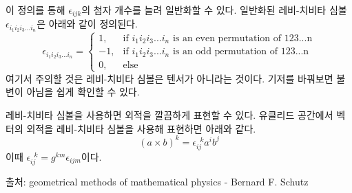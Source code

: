이 정의를 통해 $\epsilon_{ijk}$의 첨자 개수를 늘려 일반화할 수 있다. 일반화된 레비-치비타 심볼 $\epsilon_{i_1 i_2 i_3 ... i_n}$은 아래와 같이 정의된다.
\begin{equation}
    \epsilon_{i_1 i_2 i_3 ... i_n}=
    \begin{cases}
    1, & \mbox{if }i_1 i_2 i_3 ... i_n\mbox{ is an even permutation of 123...n}\\
    -1, & \mbox{if }i_1 i_2 i_3 ... i_n\mbox{ is an odd permutation of 123...n}\\
    0, & \mbox{else}
    \end{cases}
\end{equation}
여기서 주의할 것은 레비-치비타 심볼은 텐서가 아니라는 것이다. 기저를 바꿔보면 불변이 아님을 쉽게 확인할 수 있다.

레비-치비타 심볼을 사용하면 외적을 깔끔하게 표현할 수 있다. 유클리드 공간에서 벡터의 외적을 레비-치비타 심볼을 사용해 표현하면 아래와 같다.
\begin{equation}
    (a \times b)^k=\epsilon_{ij}^{\;\;k}a^ib^j
\end{equation}
이때 $\epsilon_{ij}^{\;\;k}=g^{km}\epsilon_{ijm}$이다.

출처: geometrical methods of mathematical physics - Bernard F. Schutz

